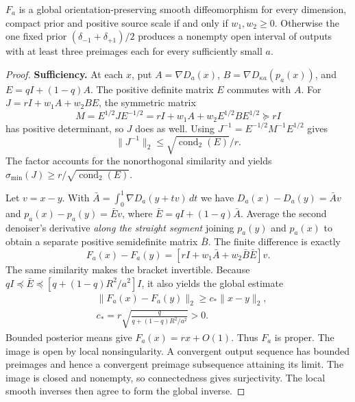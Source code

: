 \documentclass[10pt,twocolumn,letterpaper]{article}
\begin{document}
\begin{theorem}
$F_a$ is a global orientation-preserving smooth diffeomorphism for every dimension, compact prior and positive source scale if and only if $w_1,w_2\ge0$. Otherwise the one fixed prior $(\delta_{-1}+\delta_{+1})/2$ produces a nonempty open interval of outputs with at least three preimages each for every sufficiently small $a$.
\end{theorem}

\begin{proof}
\textbf{Sufficiency.}
At each $x$, put $A=\nabla D_a(x)$, $B=\nabla D_{\kappa a}(p_a(x))$, and $E=qI+(1-q)A$. The positive definite matrix $E$ commutes with $A$. For $J=rI+w_1A+w_2BE$, the symmetric matrix
\[
 M=E^{1/2}JE^{-1/2}=rI+w_1A+w_2E^{1/2}BE^{1/2}\succeq rI
\]
has positive determinant, so $J$ does as well. Using $J^{-1}=E^{-1/2}M^{-1}E^{1/2}$ gives
\[
 \|J^{-1}\|_2\le\sqrt{\operatorname{cond}_2(E)}/r .
\]
The factor accounts for the nonorthogonal similarity and yields $\sigma_{\min}(J)\ge r/\sqrt{\operatorname{cond}_2(E)}$.

Let $v=x-y$. With $\bar A=\int_0^1\nabla D_a(y+t v)\,dt$ we have $D_a(x)-D_a(y)=\bar A v$ and $p_a(x)-p_a(y)=\bar E v$, where $\bar E=qI+(1-q)\bar A$. Average the second denoiser's derivative \emph{along the straight segment} joining $p_a(y)$ and $p_a(x)$ to obtain a separate positive semidefinite matrix $\bar B$. The finite difference is exactly
\[
 F_a(x)-F_a(y)=[rI+w_1\bar A+w_2\bar B\bar E]v.
\]
The same similarity makes the bracket invertible. Because $qI\preceq\bar E\preceq [q+(1-q)R^2/a^2]I$, it also yields the global estimate
\begin{equation}
 \begin{aligned}
 &\|F_a(x)-F_a(y)\|_2\ge c_*\|x-y\|_2,\\
 &c_*=r\sqrt{\frac{q}{q+(1-q)R^2/a^2}}>0.
 \end{aligned}
 \label{eq:colip}
\end{equation}
Bounded posterior means give $F_a(x)=rx+O(1)$. Thus $F_a$ is proper. The image is open by local nonsingularity. A convergent output sequence has bounded preimages and hence a convergent preimage subsequence attaining its limit. The image is closed and nonempty, so connectedness gives surjectivity. The local smooth inverses then agree to form the global inverse.


\end{proof}
\end{document}

